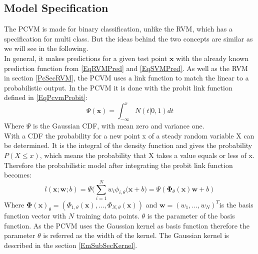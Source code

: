 \subsection{Model Specification}\label{PcSecCM}
The \acs{PCVM} is made for binary classification\cite{Chen.2009}, unlike the \acs{RVM}, which has a specification for multi class.\cite[p. 220]{Tipping.2001} But the ideas behind the two concepts are similar as we will see in the following.\\
In general, it makes predictions for a given test point $\mathbf{x}$ with the already known prediction function from \eqref{EqRVMPred} and \eqref{EqSVMPred}.\cite{Chen.2009}
As well as the \acs{RVM} in section \ref{PcSecRVM}, the \acs{PCVM} uses a link function to match the linear to a probabilistic output.
In the PCVM it is done with the probit link function defined in \ref{EqPcvmProbit}:\cite{Chen.2014}
\begin{equation}\label{EqPcvmProbit}
\Psi(\mathbf{x}) = \int_{-\infty}^{x}N(t\vert 0,1)dt
\end{equation}
Where $\Psi$ is the Gaussian \ac{CDF}, with mean zero and variance one.\\
With a \ac{CDF} the probability for a new point x of a steady random variable X can be determined.
It is the integral of the density function and gives the probability $P(X \le x)$, which means the probability that X takes a value equals or less of x.\cite[p. 270]{Teschl.2014}\\
Therefore the probabilistic model after integrating the probit link function becomes:
\begin{equation}
l(\mathbf{x};\mathbf{w};b) = \Psi\bigg(\sum_{i=1}^{N}w_i\phi_{i,\theta}(\mathbf{x}+b \bigg) = \Psi(\boldsymbol{\Phi}_\theta(\mathbf{x})\mathbf{w}+b)
\end{equation}
Where $\boldsymbol{\Phi(\mathbf{x})}_\theta=(\Phi_{1,\theta}(\mathbf{x}),\dots,\Phi_{N,\theta}(\mathbf{x}))$ and $\mathbf{w} = (w_1,\dots,w_N)^T$is the basis function vector with $N$ training data points.
$\theta$ is the parameter of the basis function. As the \ac{PCVM} uses the Gaussian kernel as basis function therefore the parameter $\theta$ is referred as the width of the kernel.\cite{Chen.2009}
The Gaussian kernel is described in the section \ref{EmSubSecKernel}.
